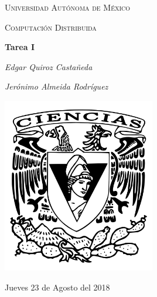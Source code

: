 \documentclass[12pt,a4paper]{report}
\begin{document}
\begin{titlepage}
	\centering
	{\scshape\LARGE Universidad Autónoma de México \par}
	\vspace{1cm}
	{\scshape\Large Computación Distribuida\par}
	\vspace{1.5cm}
	{\huge\bfseries Tarea I\par}
	\vspace{.5cm}
	{\Large\itshape Edgar Quiroz Castañeda \par}
    \vspace{.5cm}
	{\Large\itshape Jerónimo Almeida Rodríguez \par}
	\vfill
	 \includegraphics[width=0.5\textwidth]{escudo_f-ciencias.png}
	\vfill

	{\large Jueves 23 de Agosto del 2018 \par}
\end{titlepage}

\pagebreak
\setlength{\voffset}{-0.75in}
\setlength{\headsep}{5pt}

\newcommand{\ed}[2]{(#1) edge (#2)}
\newcommand{\eee}[4]{\path [->,draw,thin] ($ (#1) !.5! (#2)$) -- ($ (#3) !.5! (#4) $);}
\end{document}
